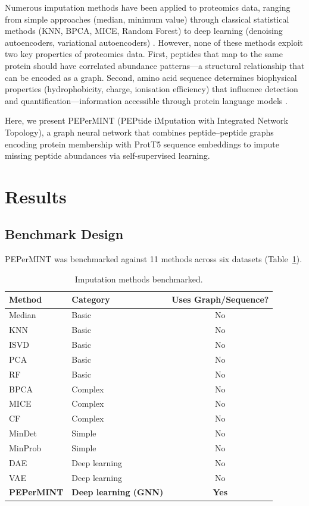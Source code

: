 \documentclass[11pt]{article}
\begin{document}
Numerous imputation methods have been applied to proteomics data, ranging from simple approaches (median, minimum value) through classical statistical methods (KNN, BPCA, MICE, Random Forest) to deep learning (denoising autoencoders, variational autoencoders) \citep{troyanskaya2001missing, oba2003bayesian, stekhoven2012missforest, buuren2011mice, vincent2008extracting, kingma2014auto}. However, none of these methods exploit two key properties of proteomics data. First, peptides that map to the same protein should have correlated abundance patterns---a structural relationship that can be encoded as a graph. Second, amino acid sequence determines biophysical properties (hydrophobicity, charge, ionisation efficiency) that influence detection and quantification---information accessible through protein language models \citep{elnaggar2021prottrans}.

Here, we present PEPerMINT (PEPtide iMputation with Integrated Network Topology), a graph neural network \citep{velickovic2018graph, kipf2017semi} that combines peptide--peptide graphs encoding protein membership with ProtT5 sequence embeddings to impute missing peptide abundances via self-supervised learning.

\section{Results}

\subsection{Benchmark Design}

PEPerMINT was benchmarked against 11 methods across six datasets (Table~\ref{tab:methods}).

\begin{table}[H]
\centering
\caption{Imputation methods benchmarked.}
\label{tab:methods}
\begin{tabular}{@{}llc@{}}
\toprule
Method & Category & Uses Graph/Sequence? \\
\midrule
Median & Basic & No \\
KNN & Basic & No \\
ISVD & Basic & No \\
PCA & Basic & No \\
RF & Basic & No \\
BPCA & Complex & No \\
MICE & Complex & No \\
CF & Complex & No \\
MinDet & Simple & No \\
MinProb & Simple & No \\
DAE & Deep learning & No \\
VAE & Deep learning & No \\
\textbf{PEPerMINT} & \textbf{Deep learning (GNN)} & \textbf{Yes} \\
\bottomrule
\end{tabular}
\end{table}
\end{document}

